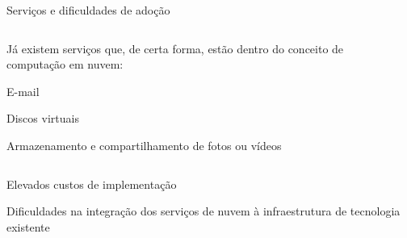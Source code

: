 \begin{frame}{Serviços e dificuldades de adoção}
    \begin{columns}

        \begin{column}{0.5\textwidth}
            Já existem serviços que, de certa forma, estão dentro do conceito
            de computação em nuvem:
            \begin{itemise}
                \item<2-> E-mail
                \item<2-> Discos virtuais
                \item<2-> Armazenamento e compartilhamento de fotos ou vídeos
            \end{itemise}

        \end{column}

        \begin{column}{0.5\textwidth}
        \end{column}

    \end{columns}

    \begin{itemise}
        \item<4-> Elevados custos de implementação
        \item<5-> Dificuldades na integração dos serviços de nuvem à infraestrutura de
            tecnologia existente
    \end{itemise}
\end{frame}
